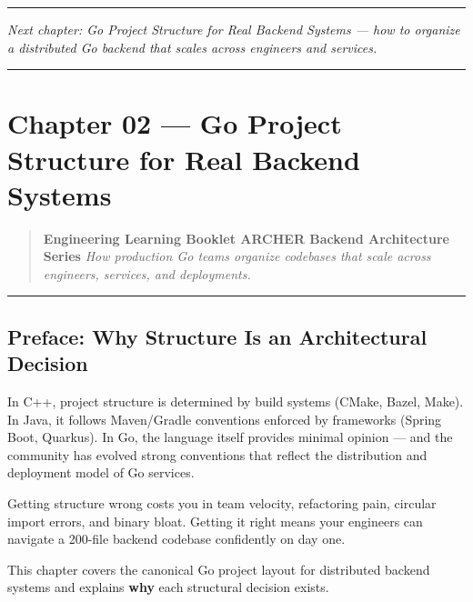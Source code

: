 \documentclass[
]{article}
\begin{document}
\begin{center}\rule{0.5\linewidth}{0.5pt}\end{center}

\emph{Next chapter: Go Project Structure for Real Backend Systems ---
how to organize a distributed Go backend that scales across engineers
and services.}

\begin{center}\rule{0.5\linewidth}{0.5pt}\end{center}

\hypertarget{chapter-02-go-project-structure-for-real-backend-systems}{%
\section{Chapter 02 --- Go Project Structure for Real Backend
Systems}\label{chapter-02-go-project-structure-for-real-backend-systems}}

\begin{quote}
\textbf{Engineering Learning Booklet \textbar{} ARCHER Backend
Architecture Series} \emph{How production Go teams organize codebases
that scale across engineers, services, and deployments.}
\end{quote}

\begin{center}\rule{0.5\linewidth}{0.5pt}\end{center}

\hypertarget{preface-why-structure-is-an-architectural-decision}{%
\subsection{Preface: Why Structure Is an Architectural
Decision}\label{preface-why-structure-is-an-architectural-decision}}

In C++, project structure is determined by build systems (CMake, Bazel,
Make). In Java, it follows Maven/Gradle conventions enforced by
frameworks (Spring Boot, Quarkus). In Go, the language itself provides
minimal opinion --- and the community has evolved strong conventions
that reflect the distribution and deployment model of Go services.

Getting structure wrong costs you in team velocity, refactoring pain,
circular import errors, and binary bloat. Getting it right means your
engineers can navigate a 200-file backend codebase confidently on day
one.

This chapter covers the canonical Go project layout for distributed
backend systems and explains \textbf{why} each structural decision
exists.
\end{document}
